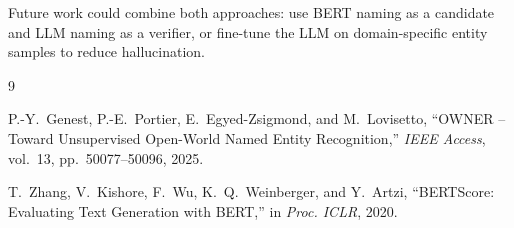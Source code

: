 \documentclass[11pt,a4paper]{article}
\begin{document}
Future work could combine both approaches: use BERT naming as a candidate
and LLM naming as a verifier, or fine-tune the LLM on domain-specific
entity samples to reduce hallucination.

\begin{thebibliography}{9}

P.-Y.~Genest, P.-E.~Portier, E.~Egyed-Zsigmond, and M.~Lovisetto,
``OWNER -- Toward Unsupervised Open-World Named Entity Recognition,''
\textit{IEEE Access}, vol.~13, pp.~50077--50096, 2025.

T.~Zhang, V.~Kishore, F.~Wu, K.~Q.~Weinberger, and Y.~Artzi,
``BERTScore: Evaluating Text Generation with BERT,''
in \textit{Proc. ICLR}, 2020.

\end{thebibliography}
\end{document}
